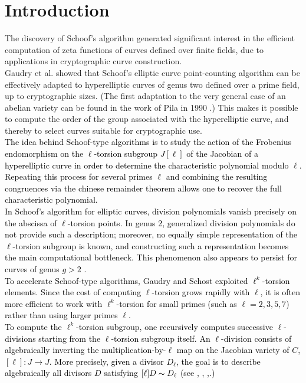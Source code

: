 \documentclass[11pt,a4paper]{article}
\theoremstyle{plain}
\theoremstyle{definition}
\theoremstyle{remark}
\newcommand{\verde}[1]{\textcolor{black}{#1}}
\newcommand{\azul}[1]{\textcolor{black}{#1}}
\begin{document}
\section{Introduction}
The discovery of Schoof's algorithm \cite{rs} generated significant interest in the efficient computation of zeta functions of curves defined over finite fields, due to applications in cryptographic curve construction.\\
Gaudry et al. \cite{GS00, GS04, GS12} showed that Schoof's elliptic curve point-counting algorithm \cite{rs} can be effectively adapted to hyperelliptic curves of genus two defined over a prime field, up to cryptographic sizes. (The first adaptation to the very general case of an abelian variety can be found in the work of Pila in 1990 \cite{Pila}.) This makes it possible to compute the order of the group associated with the \azul{hyperelliptic curve}, and thereby to select curves suitable for cryptographic use.\\
\azul{The idea behind Schoof-type algorithms is to study the action of the Frobenius endomorphism on the $\ell$-torsion subgroup $J[\ell]$ of the Jacobian of a hyperelliptic curve in order to determine the characteristic polynomial modulo $\ell$. Repeating this process for several primes $\ell$ and combining the resulting congruences via the \verde{ chinese remainder theorem} allows one to recover the full characteristic polynomial.
\\
In Schoof's algorithm for elliptic curves, division polynomials \verde{vanish precisely on the abscissa of $\ell$-torsion points}.  In genus 2, generalized division polynomials \cite{Cantor1994} do not provide such a description; moreover, no equally simple representation of the $\ell$-torsion subgroup is known, and constructing such a representation becomes the main computational bottleneck. This phenomenon also appears to persist for curves of genus $g>2$ \cite{Abelard2018} .
\\
To accelerate Schoof-type algorithms, Gaudry and Schost exploited $\ell^k$-torsion elements. Since the cost of computing $\ell$-torsion grows rapidly with $\ell$, it is often more efficient to work with $\ell^k$-torsion for small primes (such as $\ell=2,3,5,7$) rather than using larger primes $\ell$.\\
To compute the $\ell^k$-torsion subgroup, one recursively computes successive $\ell$-divisions starting from the $\ell$-torsion subgroup itself. An $\ell$-division consists of algebraically inverting the multiplication-by-$\ell$ map  on the Jacobian variety of $C$, $[\ell]:J\to J.$ 
More precisely, given a divisor $D_\ell$, the goal is to describe algebraically all divisors $D$ satisfying \verde{$[\ell]D\thicksim  D_{\ell}$} (see  \cite{GS12}, \cite{Miret24}, \cite{riquelme2016},\cite{Riquelme2019}.)
}
\end{document}
